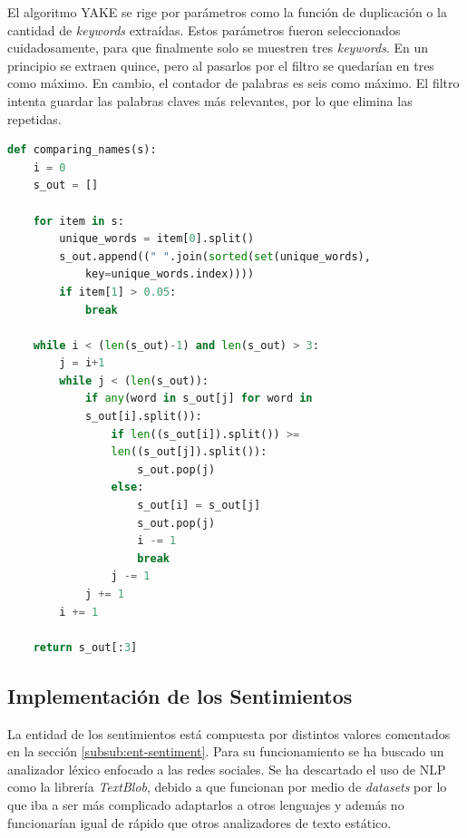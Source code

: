 El algoritmo \ac{YAKE} se rige por parámetros como la función de duplicación o la cantidad de \textit{keywords} extraídas. Estos parámetros fueron seleccionados cuidadosamente, para que finalmente solo se muestren tres \textit{keywords}. En un principio se extraen quince, pero al pasarlos por el filtro se quedarían en tres como máximo. En cambio, el contador de palabras es seis como máximo. El filtro intenta guardar las palabras claves más relevantes, por lo que elimina las repetidas.

\vspace{0.3cm}

\begin{lstlisting}[caption=Filtrado de las \textit{keywords},          label={lst:listing-python},language=Python]
def comparing_names(s):
    i = 0
    s_out = []

    for item in s:
        unique_words = item[0].split()
        s_out.append((" ".join(sorted(set(unique_words),
            key=unique_words.index))))
        if item[1] > 0.05:
            break

    while i < (len(s_out)-1) and len(s_out) > 3:
        j = i+1
        while j < (len(s_out)):
            if any(word in s_out[j] for word in 
            s_out[i].split()):
                if len((s_out[i]).split()) >= 
                len((s_out[j]).split()):
                    s_out.pop(j)
                else:
                    s_out[i] = s_out[j]
                    s_out.pop(j)
                    i -= 1
                    break
                j -= 1
            j += 1
        i += 1

    return s_out[:3]
\end{lstlisting}

\subsection{Implementación de los Sentimientos}
La entidad de los sentimientos está compuesta por distintos valores comentados en la sección \ref{subsub:ent-sentiment}. Para su funcionamiento se ha buscado un analizador léxico enfocado a las redes sociales. Se ha descartado el uso de \ac{NLP} como la librería \textit{TextBlob}, debido a que funcionan por medio de \textit{datasets} por lo que iba a ser más complicado adaptarlos a otros lenguajes y además no funcionarían igual de rápido que otros analizadores de texto estático.

\vspace{0.3cm}

